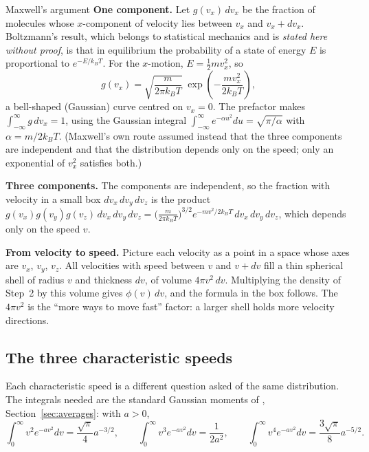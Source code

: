 \begin{derivbox}{Maxwell's argument}
 \textbf{One component.} Let $g(v_x)\,dv_x$ be the fraction of molecules whose $x$-component of
velocity lies between $v_x$ and $v_x+dv_x$. Boltzmann's result, which belongs to statistical mechanics
and is \emph{stated here without proof}, is that in equilibrium the probability of a state of energy $E$
is proportional to $e^{-E/k_BT}$. For the $x$-motion, $E=\tfrac12mv_x^2$, so
\[
g(v_x) = \sqrt{\frac{m}{2\pi k_BT}}\;\exp\!\left(-\frac{m v_x^2}{2k_BT}\right),
\]
a bell-shaped (Gaussian) curve centred on $v_x=0$. The prefactor makes $\int_{-\infty}^{\infty}
g\,dv_x=1$, using the Gaussian integral $\int_{-\infty}^{\infty}e^{-\alpha u^2}du=\sqrt{\pi/\alpha}$
with $\alpha=m/2k_BT$. (Maxwell's own route assumed instead that the three components are independent and
that the distribution depends only on the speed; only an exponential of $v_x^2$ satisfies both.)

 \textbf{Three components.} The components are independent, so the fraction with velocity in a
small box $dv_x\,dv_y\,dv_z$ is the product
$g(v_x)g(v_y)g(v_z)\,dv_x\,dv_y\,dv_z
=\bigl(\tfrac{m}{2\pi k_BT}\bigr)^{3/2}e^{-mv^2/2k_BT}\,dv_x\,dv_y\,dv_z$,
which depends only on the speed $v$.

 \textbf{From velocity to speed.} Picture each velocity as a point in a space whose axes are
$v_x$, $v_y$, $v_z$. All velocities with speed between $v$ and $v+dv$ fill a thin spherical shell of
radius $v$ and thickness $dv$, of volume $4\pi v^2\,dv$. Multiplying the density of Step~2 by this volume
gives $\phi(v)\,dv$, and the formula in the box follows. The $4\pi v^2$ is the ``more ways to move fast''
factor: a larger shell holds more velocity directions.
\end{derivbox}

\subsection{The three characteristic speeds}

Each characteristic speed is a different question asked of the same distribution. The integrals needed are
the standard Gaussian moments of , Section~\ref{sec:averages}: with $a>0$,
\[
\int_0^\infty v^2e^{-av^2}dv=\frac{\sqrt\pi}{4}a^{-3/2},\qquad
\int_0^\infty v^3e^{-av^2}dv=\frac{1}{2a^2},\qquad
\int_0^\infty v^4e^{-av^2}dv=\frac{3\sqrt\pi}{8}a^{-5/2}.
\]

